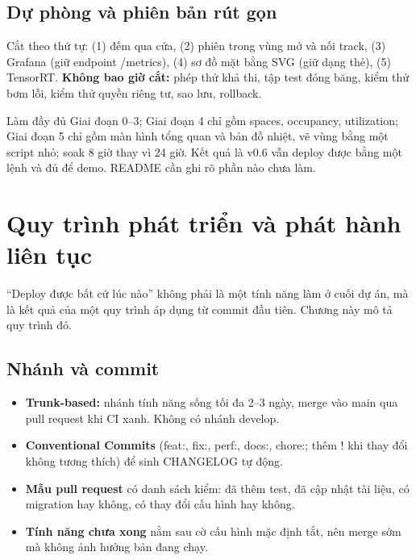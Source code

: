 \documentclass[10pt,a4paper,oneside,openany]{report}
\newcommand{\breakus}{\textunderscore\allowbreak}
\newcommand{\code}[1]{{\ttfamily\let\_\breakus #1}}
\begin{document}
\section{Dự phòng và phiên bản rút gọn}
\begin{chuy}
Cắt theo thứ tự: (1) đếm qua cửa, (2) phiên trong vùng mở và nối track, (3) Grafana (giữ endpoint \code{/metrics}),
(4) sơ đồ mặt bằng SVG (giữ dạng thẻ), (5) TensorRT. \textbf{Không bao giờ cắt:} phép thử khả thi, tập test đóng băng, kiểm thử bơm lỗi,
kiểm thử quyền riêng tư, sao lưu, rollback.
\end{chuy}

\begin{meo}
Làm đầy đủ Giai đoạn 0--3; Giai đoạn 4 chỉ gồm \code{spaces}, \code{occupancy}, \code{utilization}; Giai đoạn 5 chỉ gồm màn hình tổng quan và
bản đồ nhiệt, vẽ vùng bằng một script nhỏ; soak 8 giờ thay vì 24 giờ. Kết quả là v0.6 vẫn deploy được bằng một lệnh và đủ để demo.
README cần ghi rõ phần nào chưa làm.
\end{meo}
\chapter{Quy trình phát triển và phát hành liên tục}\label{ch:quytrinh}

\enquote{Deploy được bất cứ lúc nào} không phải là một tính năng làm ở cuối dự án, mà là kết quả của một quy trình áp dụng từ commit đầu tiên.
Chương này mô tả quy trình đó.

\section{Nhánh và commit}
\begin{itemize}
  \item \textbf{Trunk-based:} nhánh tính năng sống tối đa 2--3 ngày, merge vào \code{main} qua pull request khi CI xanh. Không có nhánh \code{develop}.
  \item \textbf{Conventional Commits} (\code{feat:}, \code{fix:}, \code{perf:}, \code{docs:}, \code{chore:}; thêm \code{!} khi thay đổi không tương thích) để sinh CHANGELOG tự động.
  \item \textbf{Mẫu pull request} có danh sách kiểm: đã thêm test, đã cập nhật tài liệu, có migration hay không, có thay đổi cấu hình hay không.
  \item \textbf{Tính năng chưa xong} nằm sau cờ cấu hình mặc định tắt, nên merge sớm mà không ảnh hưởng bản đang chạy.
\end{itemize}
\end{document}
